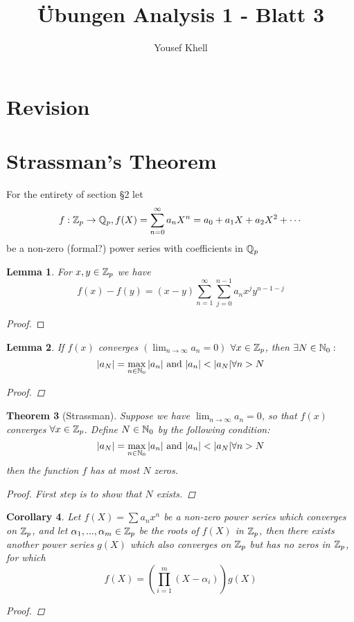 \documentclass[a4paper]{article}
\title{\vspace{-2cm}Übungen Analysis 1 - Blatt 3}
\author{Yousef Khell}
\theoremstyle{plain}
\newtheorem{thm}{Theorem}[section]
\newtheorem{lemm}[thm]{Lemma}
\newtheorem{Cor}[thm]{Corollary}
\theoremstyle{definition}
\begin{document}
\section{Revision}
\section{Strassman's Theorem}
For the entirety of section §2 let
$$f: \Bbb Z_{p} \to \Bbb Q_{p}, f(X) = \sum_{n=0}^{\infty}a_{n}X^{n} = a_{0} + a_{1}X + a_{2}X^{2} + \cdots$$
be a non-zero (formal?) power series with coefficients in $\Bbb Q_{p}$
\begin{lemm}
  For $x, y \in \Bbb Z_{p}$ we have
  $$f(x) - f(y) = (x-y)\sum_{n=1}^{\infty}\sum_{j=0}^{n-1}a_{n}x^{j}y^{n-1-j}$$
\end{lemm}
\begin{proof}

\end{proof}
\begin{lemm}
If $f(x)$ converges $(\lim_{n\to \infty} a_{n} = 0)$ $\forall x \in \Bbb Z_{p}$, then $\exists N \in \Bbb N_{0}:$
$$|a_{N}| = \max_{n \in \Bbb N_{0}}|a_{n}| \text{ and } |a_{n}| < |a_{N}| \forall n > N$$
\begin{proof}

\end{proof}
\end{lemm}
\begin{thm}[Strassman] %
Suppose we have $\lim_{n \to \infty}a_{n} = 0$, so that $f(x)$ converges $\forall x \in \Bbb Z_{p}$. Define $N \in \Bbb N_{0}$ by the following condition:
$$|a_{N}| = \max_{n \in \Bbb N_{0}}|a_{n}| \text{ and } |a_{n}| < |a_{N}| \forall n > N$$
then the function $f$ has at most $N$ zeros.
\begin{proof}
First step is to show that $N$ exists.
\end{proof}
\end{thm}
\begin{Cor}
  Let $f(X) = \sum a_{n}x^{n}$ be a non-zero power series which converges on $\Bbb Z_{p}$, and let $\alpha_{1}, ..., \alpha_{m} \in \Bbb Z_{p}$ be the roots of $f(X)$ in $\Bbb Z_{p}$, then there exists another power series $g(X)$ which also converges on $\Bbb Z_{p}$ but has no zeros in $\Bbb Z_{p}$, for which
  $$f(X) = \left(\prod_{i=1}^{m}(X-\alpha_{i})\right)g(X)$$
  \begin{proof}

  \end{proof}
\end{Cor}
\end{document}
